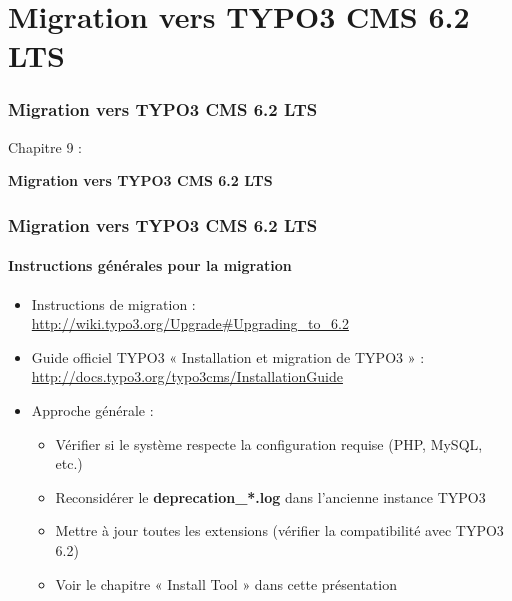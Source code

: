 %

\section{Migration vers TYPO3 CMS 6.2 LTS}
\begin{frame}[fragile]
	\frametitle{Migration vers TYPO3 CMS 6.2 LTS}

	\begin{center}\huge{Chapitre 9 :}\end{center}
	\begin{center}\huge{\color{typo3darkgrey}\textbf{Migration vers TYPO3 CMS 6.2 LTS}}\end{center}

\end{frame}


\begin{frame}[fragile]
	\frametitle{Migration vers TYPO3 CMS 6.2 LTS}
	\framesubtitle{Instructions générales pour la migration}

	\begin{itemize}

		\item Instructions de migration :\newline
			\smaller\url{http://wiki.typo3.org/Upgrade#Upgrading_to_6.2}\normalsize
		\item Guide officiel TYPO3 « Installation et migration de TYPO3 » :
			\smaller\url{http://docs.typo3.org/typo3cms/InstallationGuide}\normalsize
				\item Approche générale :
			\begin{itemize}
				\item Vérifier si le système respecte la configuration requise \small(PHP, MySQL, etc.)\normalsize
				\item Reconsidérer le \textbf{deprecation\_*.log} dans l'ancienne instance TYPO3
				\item Mettre à jour toutes les extensions\newline
					\small(vérifier la compatibilité avec TYPO3 6.2)\normalsize
				\item Voir le chapitre « Install Tool » dans cette présentation
			\end{itemize}
	\end{itemize}

\end{frame}


